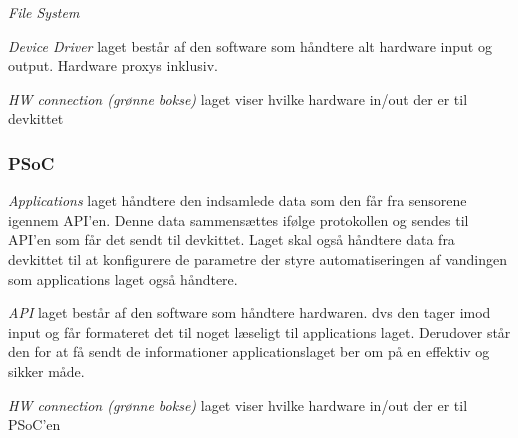 \textit{File System}

\textit{Device Driver} laget består af den software som håndtere alt hardware input og output. Hardware proxys inklusiv.

\textit{HW connection (grønne bokse)} laget viser hvilke hardware in/out der er til devkittet

\subsubsection{PSoC}

\textit{Applications} laget håndtere den indsamlede data som den får fra sensorene igennem API'en. Denne data sammensættes ifølge protokollen og sendes til API'en som får det sendt til devkittet. Laget skal også håndtere data fra devkittet til at konfigurere de parametre der styre automatiseringen af vandingen som applications laget også håndtere.

\textit{API} laget består af den software som håndtere hardwaren. dvs den tager imod input og får formateret det til noget læseligt til applications laget. Derudover står den for at få sendt de informationer applicationslaget ber om på en effektiv og sikker måde.

\textit{HW connection (grønne bokse)} laget viser hvilke hardware in/out der er til PSoC'en